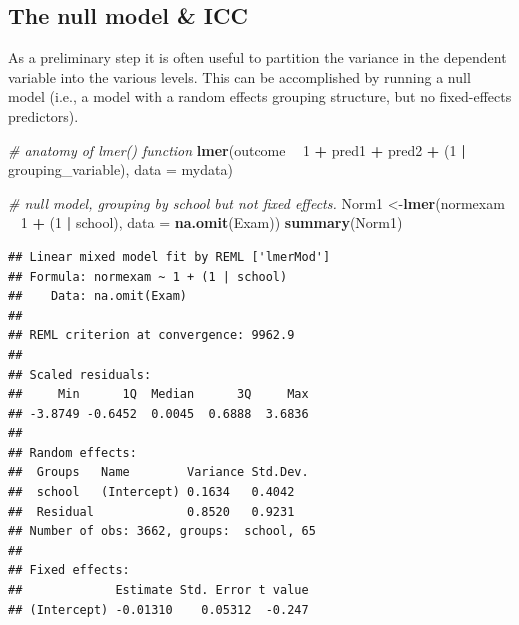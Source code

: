 \documentclass[]{book}
\newenvironment{Shaded}{\begin{snugshade}}{\end{snugshade}}
\newcommand{\CommentTok}[1]{\textcolor[rgb]{0.56,0.35,0.01}{\textit{#1}}}
\newcommand{\DataTypeTok}[1]{\textcolor[rgb]{0.13,0.29,0.53}{#1}}
\newcommand{\DecValTok}[1]{\textcolor[rgb]{0.00,0.00,0.81}{#1}}
\newcommand{\KeywordTok}[1]{\textcolor[rgb]{0.13,0.29,0.53}{\textbf{#1}}}
\newcommand{\NormalTok}[1]{#1}
\newcommand{\OperatorTok}[1]{\textcolor[rgb]{0.81,0.36,0.00}{\textbf{#1}}}
\newcommand{\StringTok}[1]{\textcolor[rgb]{0.31,0.60,0.02}{#1}}
\begin{document}
\hypertarget{the-null-model-icc}{%
\subsection{The null model \& ICC}\label{the-null-model-icc}}

As a preliminary step it is often useful to partition the variance in the dependent variable into the various levels. This can be accomplished by running a null model (i.e., a model with a random effects grouping structure, but no fixed-effects predictors).

\begin{Shaded}
\begin{Highlighting}[]
  \CommentTok{# anatomy of lmer() function}
  \KeywordTok{lmer}\NormalTok{(outcome }\OperatorTok{~}\StringTok{ }\DecValTok{1} \OperatorTok{+}\StringTok{ }\NormalTok{pred1 }\OperatorTok{+}\StringTok{ }\NormalTok{pred2 }\OperatorTok{+}\StringTok{ }\NormalTok{(}\DecValTok{1} \OperatorTok{|}\StringTok{ }\NormalTok{grouping_variable), }
       \DataTypeTok{data =}\NormalTok{ mydata)}
\end{Highlighting}
\end{Shaded}

\begin{Shaded}
\begin{Highlighting}[]
  \CommentTok{# null model, grouping by school but not fixed effects.}
\NormalTok{  Norm1 <-}\KeywordTok{lmer}\NormalTok{(normexam }\OperatorTok{~}\StringTok{ }\DecValTok{1} \OperatorTok{+}\StringTok{ }\NormalTok{(}\DecValTok{1} \OperatorTok{|}\StringTok{ }\NormalTok{school), }
              \DataTypeTok{data =} \KeywordTok{na.omit}\NormalTok{(Exam))}
  \KeywordTok{summary}\NormalTok{(Norm1)}
\end{Highlighting}
\end{Shaded}

\begin{verbatim}
## Linear mixed model fit by REML ['lmerMod']
## Formula: normexam ~ 1 + (1 | school)
##    Data: na.omit(Exam)
## 
## REML criterion at convergence: 9962.9
## 
## Scaled residuals: 
##     Min      1Q  Median      3Q     Max 
## -3.8749 -0.6452  0.0045  0.6888  3.6836 
## 
## Random effects:
##  Groups   Name        Variance Std.Dev.
##  school   (Intercept) 0.1634   0.4042  
##  Residual             0.8520   0.9231  
## Number of obs: 3662, groups:  school, 65
## 
## Fixed effects:
##             Estimate Std. Error t value
## (Intercept) -0.01310    0.05312  -0.247
\end{verbatim}
\end{document}
